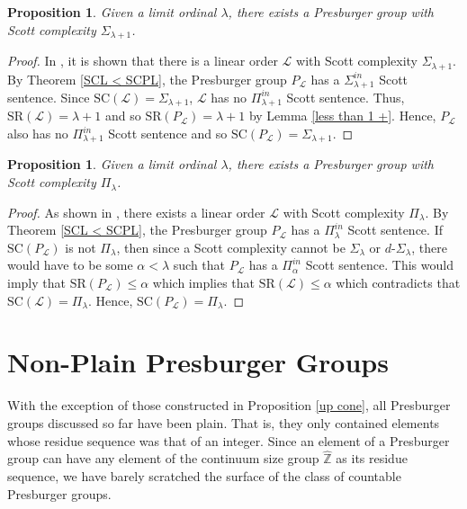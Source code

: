 \documentclass{amsart}%
\numberwithin{theorem}{section}
\newtheorem{proposition}[theorem]{Proposition}
\newcommand{\Z}{\mathbb{Z}}
\newcommand{\0}{\emptyset}
\newcommand{\LL}{\mathcal{L}}
\newcommand{\SR}{\text{SR}}
\newcommand{\SC}{\text{SC}}
\begin{document}
\begin{proposition}
\label{Sigma Lambda + 1}
Given a limit ordinal $\lambda$, there exists a Presburger group with Scott complexity $\Sigma_{\lambda + 1}$.

\end{proposition}

\begin{proof}
    In \cite{tubo-david-mathew}, it is shown that there is a linear order $\LL$ with Scott complexity $\Sigma_{\lambda+1}$. By Theorem \ref{SCL < SCPL}, the Presburger group $P_\LL$ has a $\Sigma^{in}_{\lambda+1}$ Scott sentence. Since $\SC(\LL)=\Sigma_{\lambda+1}$, $\LL$ has no $\Pi^{in}_{\lambda+1}$ Scott sentence. Thus, $\SR(\LL)=\lambda +1$ and so $\SR(P_\LL)=\lambda +1$ by Lemma \ref{less than 1 +}. Hence, $P_\LL$ also has no $\Pi^{in}_{\lambda+1}$ Scott sentence and so $\SC(P_\LL)=\Sigma_{\lambda+1}$.
\end{proof}

\begin{proposition}
\label{Pi l}
    Given a limit ordinal $\lambda$, there exists a Presburger group with Scott complexity $\Pi_\lambda$.
\end{proposition}

\begin{proof}
    As shown in \cite{david-dino}, there exists a linear order $\LL$ with Scott complexity $\Pi_{\lambda}$. By Theorem \ref{SCL < SCPL}, the Presburger group $P_\LL$ has a $\Pi_{\lambda}^{in}$ Scott sentence. If $\SC(P_\LL)$ is not $\Pi_\lambda$, then since a Scott complexity cannot be $\Sigma_\lambda$ or $d$-$\Sigma_\lambda$, there would have to be some $\alpha<\lambda$ such that $P_\LL$ has a $\Pi^{in}_\alpha$ Scott sentence. This would imply that $\SR(P_\LL)\leq \alpha$ which implies that $\SR(\LL)\leq\alpha$ which contradicts that $\SC(\LL)=\Pi_\lambda$. Hence, $\SC(P_\LL)=\Pi_\lambda$. 
\end{proof}

\section{Non-Plain Presburger Groups}
\label{non-plain section}

With the exception of those constructed in Proposition \ref{up cone}, all Presburger groups discussed so far have been plain. That is, they only contained elements whose residue sequence was that of an integer. Since an element of a Presburger group can have any element of the continuum size group $\widehat{\Z}$ as its residue sequence, we have barely scratched the surface of the class of countable Presburger groups.   
\end{document}
